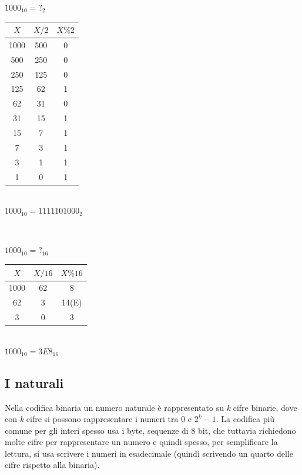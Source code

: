 \documentclass[class=book, crop=false, oneside]{standalone}
\begin{document}
\begin{center}
\begin{minipage}{0.3\textwidth}
\(1000_{10}=?_2\)\\

	\begin{tabular}{ c|c|c }
		\(X\) & \(X/2\) & \(X\%2\)\\\hline
		1000 & 500 & 0 \\
		500 & 250 & 0 \\
		250 & 125 & 0 \\
		125 & 62 & 1 \\
		62 & 31 & 0 \\
		31 & 15 & 1 \\
		15 & 7 & 1 \\
		7 & 3 & 1 \\
		3 & 1 & 1 \\
		1 & 0 & 1 \\
	\end{tabular}\\

\(1000_{10}=1111101000_2\)
\end{minipage}%
\begin{minipage}{0.2\textwidth}
~
\end{minipage}%
\begin{minipage}{0.3\textwidth}
\(1000_{10}=?_{16}\)\\

	\begin{tabular}{ c|c|c }
		\(X\) & \(X/16\) & \(X\%16\)\\\hline
		1000 & 62 & 8 \\
		62 & 3 & 14(E) \\
		3 & 0 & 3 \\
	\end{tabular}\\

\(1000_{10}=3E8_{16}\)
\end{minipage}
\end{center}


\subsection{I naturali}
Nella codifica binaria un numero naturale è rappresentato su \emph{k} cifre binarie, dove con \emph{k} cifre si possono rappresentare i numeri tra 0 e \(2^{k}-1\). La codifica più comune per gli interi spesso usa i byte, sequenze di 8 bit, che tuttavia richiedono molte cifre per rappresentare un numero e quindi spesso, per semplificare la lettura, si usa scrivere i numeri in esadecimale (quindi scrivendo un quarto delle cifre rispetto alla binaria).
\end{document}
